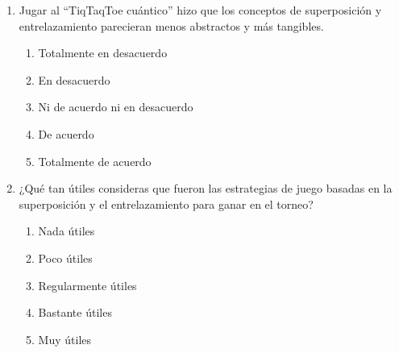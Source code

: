 \documentclass[10pt,a4paper]{article}
\begin{document}
\begin{enumerate}
    \item Jugar al ``TiqTaqToe cuántico'' hizo que los conceptos de superposición y entrelazamiento parecieran menos abstractos y más tangibles.
    \begin{enumerate}[label=\alph*)]
        \item Totalmente en desacuerdo
        \item En desacuerdo
        \item Ni de acuerdo ni en desacuerdo
        \item De acuerdo
        \item Totalmente de acuerdo
    \end{enumerate}

    \item ¿Qué tan útiles consideras que fueron las estrategias de juego basadas en la superposición y el entrelazamiento para ganar en el torneo?
    \begin{enumerate}[label=\alph*)]
        \item Nada útiles
        \item Poco útiles
        \item Regularmente útiles
        \item Bastante útiles
        \item Muy útiles
    \end{enumerate}
\end{enumerate}
\end{document}
